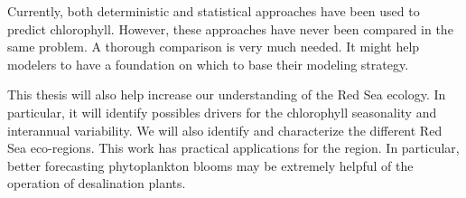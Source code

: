 Currently, both deterministic and statistical approaches have been used to predict
chlorophyll. However, these approaches have never been compared in the same
problem. A thorough comparison is very much needed. It might help modelers to
have a foundation on which to base their modeling strategy.

This thesis will also help increase our understanding of the Red Sea ecology.
In particular, it will identify possibles drivers for the chlorophyll
seasonality and interannual variability. We will also identify and
characterize the different Red Sea eco-regions. This work has practical
applications for the region. In particular, better forecasting phytoplankton
blooms may be extremely helpful of the operation of desalination plants.
